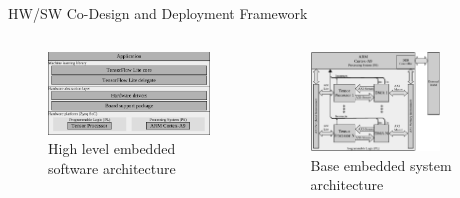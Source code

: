 \begin{frame}{HW/SW Co-Design and Deployment Framework}
	\begin{columns}[c] %
		
		\begin{column}{0.5\textwidth}
			\begin{figure}
				\includegraphics[width=\textwidth]{../chapters/cnn_accelerator/figures/sw_stack.pdf}
				\caption{ High level embedded software architecture}
			\end{figure}
		\end{column}
		
		\begin{column}{0.5\textwidth}
			\begin{figure}
				\includegraphics[width=0.8\textwidth]{../chapters/cnn_accelerator/figures/system_design.pdf} %
				\caption{ Base embedded system architecture}
			\end{figure}
		\end{column}
		
	\end{columns}
\end{frame}


